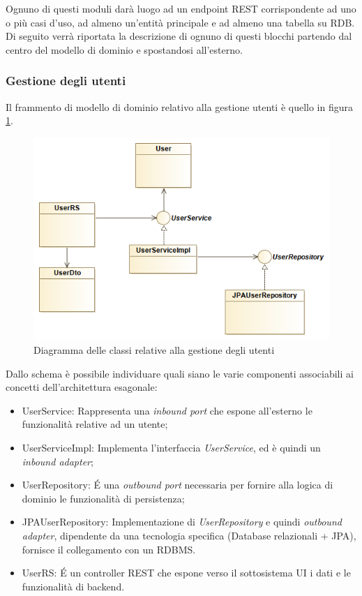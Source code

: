 Ognuno di questi moduli darà luogo ad un endpoint REST corrispondente ad uno o più casi d'uso, ad almeno un'entità principale e ad almeno una tabella su RDB.
Di seguito verrà riportata la descrizione di ognuno di questi blocchi partendo dal centro del modello di dominio e spostandosi all'esterno.

\subsubsection{Gestione degli utenti}
Il frammento di modello di dominio relativo alla gestione utenti è quello in figura \ref{fig:users_diagram}.

\begin{figure}[h]
	\centering
	\includegraphics[width=\textwidth]{img/users_diagram}
	\caption{Diagramma delle classi relative alla gestione degli utenti}
	\label{fig:users_diagram}
\end{figure}

Dallo schema è possibile individuare quali siano le varie componenti associabili ai concetti dell'architettura esagonale:
\begin{itemize}
	\item UserService: Rappresenta una \textit{inbound port} che espone all'esterno le funzionalità relative ad un utente;
	\item UserServiceImpl: Implementa l'interfaccia \textit{UserService}, ed è quindi un \textit{inbound adapter};
	\item UserRepository: \'E una \textit{outbound port} necessaria per fornire alla logica di dominio le funzionalità di persistenza;
	\item JPAUserRepository: Implementazione di \textit{UserRepository} e quindi \textit{outbound adapter}, dipendente da una tecnologia specifica (Database relazionali + JPA), fornisce il collegamento con un RDBMS.
	\item UserRS: \'E un controller REST che espone verso il sottosistema UI i dati e le funzionalità di backend.
\end{itemize}

